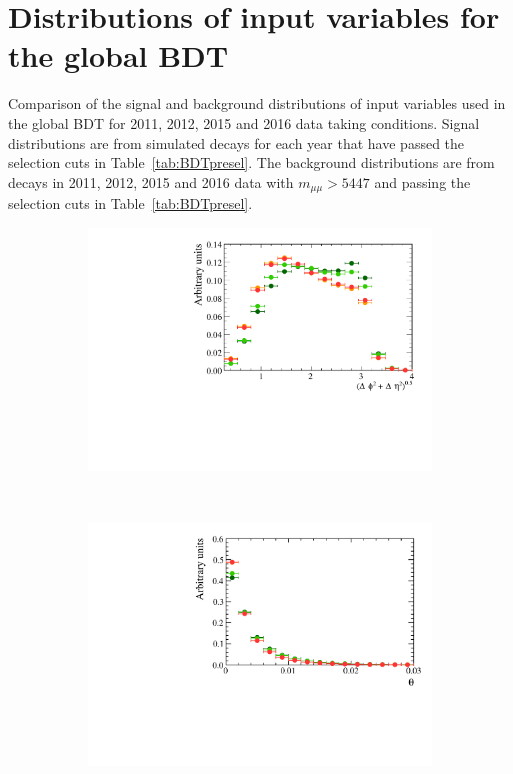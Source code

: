 \chapter{{\bf Distributions of input variables for the global BDT}}
\label{sec:appendix1}
Comparison of the signal and background distributions of input variables used in the global BDT for 2011, 2012, 2015 and 2016 data taking conditions. Signal distributions are from simulated \bsmumu decays for each year that have passed the selection cuts in Table~\ref{tab:BDTpresel}. The background distributions are from \bbbarmumux decays in 2011, 2012, 2015 and 2016 data with $m_{\mu \mu} > 5447$ \mevcc and passing the selection cuts in Table~\ref{tab:BDTpresel}.
\begin{figure}
    \centering
    \begin{subfigure}[b]{0.48\textwidth}
        \includegraphics[width=\textwidth]{./Figs/Appendix1/signal_deltaR.pdf}
    \end{subfigure}
    ~ %
    \begin{subfigure}[b]{0.48\textwidth}
       \includegraphics[width=\textwidth]{./Figs/Appendix1/signal_DIRA.pdf}
    \end{subfigure}




\end{figure}
